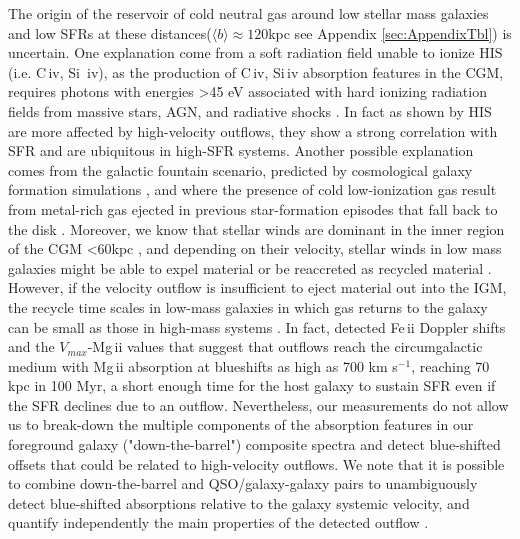 \documentclass[longauth]{aa}
\begin{document}
The origin of the reservoir of cold neutral gas around low stellar mass
galaxies and low SFRs at these distances($\langle b \rangle\approx 120$kpc
see Appendix \ref{sec:AppendixTbl}) is uncertain. One explanation come
from a soft radiation field unable to ionize HIS (i.e. C\,{\sc iv}, Si\,
{\sc iv}), as the production of C\,{\sc iv}, Si\,{\sc iv} absorption features
in the CGM, requires photons with energies >45 eV associated with hard
ionizing radiation fields from massive stars, AGN, and radiative shocks \cite
{Feltre20,Trainor15}. In fact as shown by \cite{Gatkine22} HIS are more
affected by high-velocity outflows, they show a strong correlation with SFR
and are ubiquitous in high-SFR systems. Another possible explanation comes
from the galactic fountain scenario, predicted by cosmological galaxy
formation simulations \citep{Oppenheimer10,Vogelsberger13}, and where the
presence of cold low-ionization gas result from metal-rich gas ejected in
previous star-formation episodes that fall back to the disk \citep
{Fraternali06,Hobbs15}. Moreover, we know that stellar winds are dominant in
the inner region of the CGM <60kpc \citep{Chen20}, and depending on their
velocity, stellar winds in low mass galaxies might be able to expel material
or be reaccreted as recycled material \citep{SanchezA17}. However, if the
velocity outflow is insufficient to eject material out into the IGM, the
recycle time scales in low-mass galaxies in which gas returns to the galaxy
can be small as those in high-mass systems 
\citep{vandeVoort17}. In fact, \cite{Martin12} detected Fe\,{\sc ii} Doppler
shifts and the $V_{max}$-Mg\,{\sc ii} values that suggest that outflows
reach the circumgalactic medium with Mg\,{\sc ii} absorption at blueshifts
as high as 700 km s$^{-1}$, reaching 70 kpc in 100 Myr, a short enough time
for the host galaxy to sustain SFR even if the SFR declines due to an
outflow. Nevertheless, our measurements do not allow us to break-down the
multiple components of the absorption features in our foreground galaxy
("down-the-barrel") composite spectra and detect blue-shifted offsets that
could be related to high-velocity outflows. We note that it is possible to
combine down-the-barrel and QSO/galaxy-galaxy pairs to unambiguously detect
blue-shifted absorptions relative to the galaxy systemic velocity, and
quantify independently the main properties of the detected outflow 
\citep{Kacprzak14,Bouche16,Lehner17}.
\end{document}
